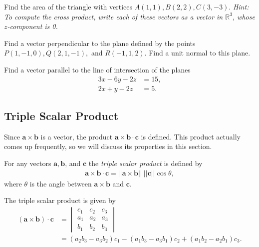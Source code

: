 \documentclass[12pt,letterpaper,reqno]{article}
\numberwithin{equation}{section}
\begin{document}
\begin{exercise}
Find the area of the triangle with vertices $A(1,1), B(2,2), C(3,-3)$. \emph{Hint: To compute the cross product, write each of these vectors as a vector in $\mathbb{R}^3$, whose $z$-component is 0.}	
\end{exercise}

\begin{exercise}
Find a vector perpendicular to the plane defined by the points $P(1,-1,0), Q(2,1,-1),$ and $R(-1,1,2)$. Find a unit normal to this plane.	
\end{exercise}

\begin{exercise}
Find a vector parallel to the line of intersection of the planes
\begin{align*}
	3x-6y-2z&=15, \\
	2x+y-2z&=5.
\end{align*}	
\end{exercise}

\subsection{Triple Scalar Product}
Since $\mathbf{a} \times \mathbf{b}$ is a vector, the product $\mathbf{a} \times \mathbf{b} \cdot \mathbf{c}$ is defined. This product actually comes up frequently, so we will discuss its properties in this section.
\begin{defn}
	For any vectors $\mathbf{a}, \mathbf{b}$, and $\mathbf{c}$ the \emph{triple scalar product} is defined by 
	\begin{align*}
		\mathbf{a} \times \mathbf{b} \cdot \mathbf{c}=||\mathbf{a} \times \mathbf{b}|| \ ||\mathbf{c}||\cos \theta,
	\end{align*}
	where $\theta$ is the angle between $\mathbf{a} \times \mathbf{b}$ and $\mathbf{c}$.
\end{defn}

\begin{prop}\label{prop:det_formula_for_stp}
	The triple scalar product is given by
	\begin{align*}
		(\mathbf{a} \times \mathbf{b}) \cdot \mathbf{c}&=\begin{vmatrix}
			c_1 & c_2 & c_3 \\
			a_1 & a_2 & a_3 \\
			b_1 & b_2 & b_3
		\end{vmatrix} \\
		&=(a_2b_3-a_3b_2)c_1-(a_1b_3-a_3b_1)c_2+(a_1b_2-a_2b_1)c_3.
	\end{align*}
\end{prop}
\end{document}
